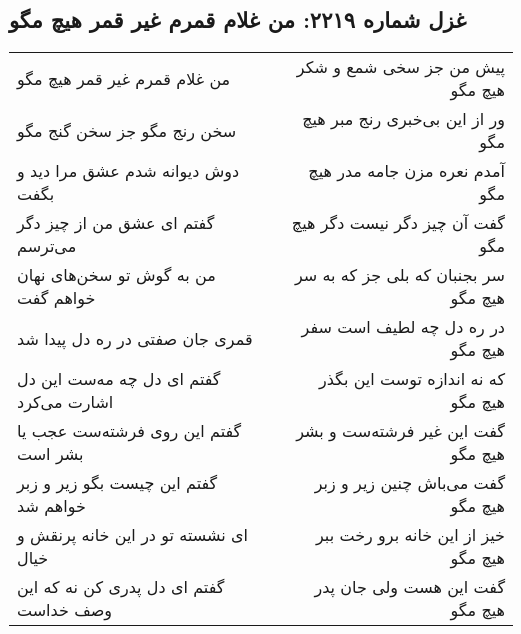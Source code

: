 \begin{center}
\section*{غزل شماره ۲۲۱۹: من غلام قمرم غیر قمر هیچ مگو}
\label{sec:2219}
\begin{longtable}{l p{0.5cm} r}
من غلام قمرم غیر قمر هیچ مگو
&&
پیش من جز سخی شمع و شکر هیچ مگو
\\
سخن رنج مگو جز سخن گنج مگو
&&
ور از این بی‌خبری رنج مبر هیچ مگو
\\
دوش دیوانه شدم عشق مرا دید و بگفت
&&
آمدم نعره مزن جامه مدر هیچ مگو
\\
گفتم ای عشق من از چیز دگر می‌ترسم
&&
گفت آن چیز دگر نیست دگر هیچ مگو
\\
من به گوش تو سخن‌های نهان خواهم گفت
&&
سر بجنبان که بلی جز که به سر هیچ مگو
\\
قمری جان صفتی در ره دل پیدا شد
&&
در ره دل چه لطیف است سفر هیچ مگو
\\
گفتم ای دل چه مه‌ست این دل اشارت می‌کرد
&&
که نه اندازه توست این بگذر هیچ مگو
\\
گفتم این روی فرشته‌ست عجب یا بشر است
&&
گفت این غیر فرشته‌ست و بشر هیچ مگو
\\
گفتم این چیست بگو زیر و زبر خواهم شد
&&
گفت می‌باش چنین زیر و زبر هیچ مگو
\\
ای نشسته تو در این خانه پرنقش و خیال
&&
خیز از این خانه برو رخت ببر هیچ مگو
\\
گفتم ای دل پدری کن نه که این وصف خداست
&&
گفت این هست ولی جان پدر هیچ مگو
\\
\end{longtable}
\end{center}
